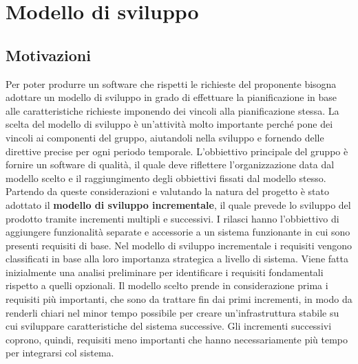 \section{Modello di sviluppo} \label{_modelloDiSviluppo}
\subsection{Motivazioni}
Per poter produrre un software che rispetti le richieste del proponente bisogna adottare un modello di sviluppo in grado di effettuare la pianificazione in base alle caratteristiche richieste imponendo dei vincoli alla pianificazione stessa. La scelta del modello di sviluppo è un'attività molto importante perché pone dei vincoli ai componenti del gruppo, aiutandoli nella sviluppo e fornendo delle direttive precise per ogni periodo temporale. L'obbiettivo principale del gruppo è fornire un software di qualità, il quale deve riflettere l'organizzazione data dal modello scelto e il raggiungimento degli obbiettivi fissati dal modello stesso.
\newline
Partendo da queste considerazioni e valutando la natura del progetto è stato adottato il \textbf{modello di sviluppo incrementale}, il quale prevede lo sviluppo del prodotto tramite incrementi multipli e successivi. I rilasci hanno l’obbiettivo di
aggiungere funzionalità separate e accessorie a un sistema funzionante in cui sono presenti requisiti di base.
\newline
Nel modello di sviluppo incrementale i requisiti vengono classificati in base alla loro importanza strategica a livello di sistema. Viene fatta inizialmente una analisi preliminare per identificare i requisiti fondamentali rispetto a quelli opzionali. Il modello scelto prende in considerazione prima i requisiti più importanti, che sono da trattare fin dai primi incrementi, in modo da renderli chiari nel minor tempo possibile per creare un'infrastruttura stabile su cui sviluppare caratteristiche del sistema successive. Gli incrementi successivi coprono, quindi, requisiti meno importanti che hanno necessariamente più tempo per integrarsi col sistema.
